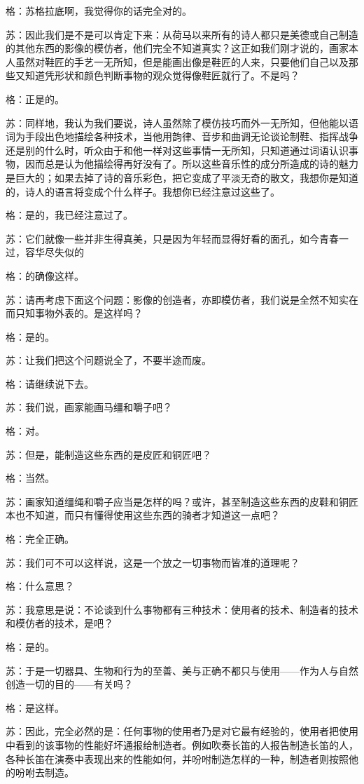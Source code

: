 \documentclass[12pt,oneside]{book}
\begin{document}
格：苏格拉底啊，我觉得你的话完全对的。

苏：因此我们是不是可以肯定下来：从荷马以来所有的诗人都只是美德或自己制造的其他东西的影像的模仿者，他们完全不知道真实？这正如我们刚才说的，画家本人虽然对鞋匠的手艺一无所知，但是能画出像是鞋匠的人来，只要他们自己以及那些又知道凭形状和颜色判断事物的观众觉得像鞋匠就行了。不是吗？

格：正是的。

苏：同样地，我认为我们要说，诗人虽然除了模仿技巧而外一无所知，但他能以语词为手段出色地描绘各种技术，当他用韵律、音步和曲调无论谈论制鞋、指挥战争还是别的什么时，听众由于和他一样对这些事情一无所知，只知道通过词语认识事物，因而总是认为他描绘得再好没有了。所以这些音乐性的成分所造成的诗的魅力是巨大的；如果去掉了诗的音乐彩色，把它变成了平淡无奇的散文，我想你是知道的，诗人的语言将变成个什么样子。我想你已经注意过这些了。

格：是的，我已经注意过了。

苏：它们就像一些并非生得真美，只是因为年轻而显得好看的面孔，如今青春一过，容华尽失似的

格：的确像这样。

苏：请再考虑下面这个问题：影像的创造者，亦即模仿者，我们说是全然不知实在而只知事物外表的。是这样吗？

格：是的。

苏：让我们把这个问题说全了，不要半途而废。

格：请继续说下去。

苏：我们说，画家能画马缰和嚼子吧？

格：对。

苏：但是，能制造这些东西的是皮匠和铜匠吧？

格：当然。

苏：画家知道缰绳和嚼子应当是怎样的吗？或许，甚至制造这些东西的皮鞋和铜匠本也不知道，而只有懂得使用这些东西的骑者才知道这一点吧？

格：完全正确。

苏：我们可不可以这样说，这是一个放之一切事物而皆准的道理呢？

格：什么意思？

苏：我意思是说：不论谈到什么事物都有三种技术：使用者的技术、制造者的技术和模仿者的技术，是吧？

格：是的。

苏：于是一切器具、生物和行为的至善、美与正确不都只与使用——作为人与自然创造一切的目的——有关吗？

格：是这样。

苏：因此，完全必然的是：任何事物的使用者乃是对它最有经验的，使用者把使用中看到的该事物的性能好坏通报给制造者。例如吹奏长笛的人报告制造长笛的人，各种长笛在演奏中表现出来的性能如何，并吩咐制造怎样的一种，制造者则按照他的吩咐去制造。
\end{document}
